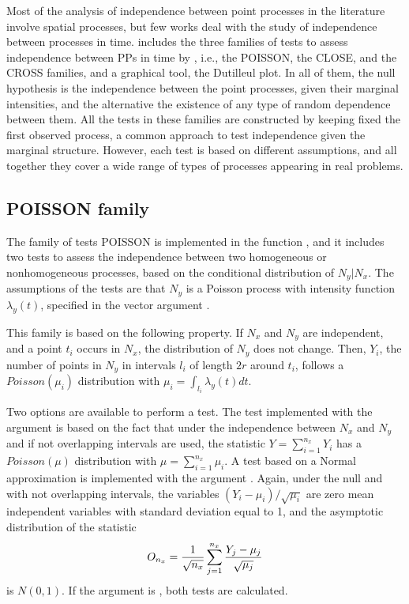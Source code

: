  Most of the analysis of independence  between point processes in the literature  involve  spatial processes, but few works deal with the study of independence between processes in time.  includes the  three families of tests   to assess independence between PPs in time by \citet{Cebrian20}, i.e.,  the POISSON, the CLOSE, and  the CROSS families, and a graphical tool, the Dutilleul plot. In all of  them, the null hypothesis  is the  independence between the point processes, given their  marginal intensities, and the alternative the existence of any type of random dependence between them. All the tests  in these families  are constructed by keeping fixed  the first  observed  process,  a common approach to test independence given the marginal structure. However, each test is based on different assumptions, and  all together they  cover a wide range of types of processes appearing in real problems.



\subsection{POISSON family}


The  family of tests POISSON is implemented in  the  function ,  and it includes two  tests to assess the independence between  two homogeneous or nonhomogeneous processes,  based on the  conditional distribution of  $N_y |N_x$.  The  assumptions of the tests are  that  $N_y$  is a Poisson process with intensity function  $\lambda_y(t)$, specified in  the vector argument .

This family is  based on the following  property.  If $N_x$ and $N_y$  are independent, and  a point $t_i$ occurs in  $N_x$,    the distribution of  $N_y$  does not change. Then,   $Y_i$, the number  of points   in $N_y$ in  intervals $l_i$ of length $2r$ around $t_i$, follows  a $ Poisson(\mu_i)$ distribution with $\mu_i=\int_{l_i} \lambda_y(t) dt$.

Two  options are available to  perform a test. The test implemented with the argument   is based on  the fact that under the  independence between $N_x$ and $N_y$ and if not overlapping intervals  are used, the  statistic  $Y=\sum_{i=1}^{n_x} Y_i$ has a $Poisson(\mu)$ distribution  with $\mu=\sum_{i=1}^{n_x} \mu_i$. 
A  test based on a Normal approximation  is  implemented with the  argument .    Again, under the null  and with not overlapping intervals, the variables $(Y_i-\mu_i)/\sqrt{\mu_i}$ are     zero mean   independent variables with standard deviation equal to 1, and  the asymptotic distribution  of the statistic
$$O_{n_x}=  {1 \over \sqrt{n_x}}\sum_{j=1}^{n_x}{Y_j-\mu_j\over \sqrt{\mu_j}}$$
is  $N(0,1)$.	If  the  argument  is , both tests are calculated. 

